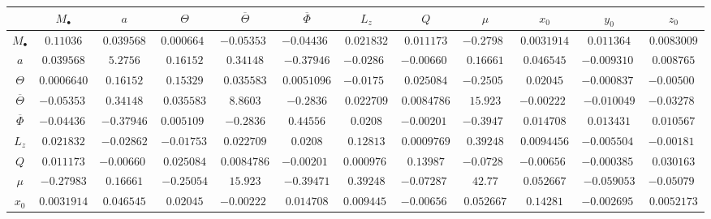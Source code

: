 \begin{sidewaystable}[htbp]
\centering
\begin{tabular}{cccccccccccc}
 & $M_\bullet$ & $a$ & $\Theta$ & $\overline{\Theta}$ & $\overline{\Phi}$ & $L_z$ & $Q$ & $\mu$ & $x_0$ & $y_0$ & $z_0$ \\ \midrule
$M_\bullet$ & $\num{0.11036}$ & $\num{0.039568}$ & $\num{0.00066402}$ & $\num{-0.053532}$ & $\num{-0.044364}$ & $\num{0.021832}$ & $\num{0.011173}$ & $\num{-0.27983}$ & $\num{0.0031914}$ & $\num{0.011364}$ & $\num{0.0083009}$\\
$a$ & $\num{0.039568}$ & $\num{5.2756}$ & $\num{0.16152}$ & $\num{0.34148}$ & $\num{-0.37946}$ & $\num{-0.02862}$ & $\num{-0.0066052}$ & $\num{0.16661}$ & $\num{0.046545}$ & $\num{-0.0093101}$ & $\num{0.008765}$\\
$\Theta$ & $\num{0.00066402}$ & $\num{0.16152}$ & $\num{0.15329}$ & $\num{0.035583}$ & $\num{0.0051096}$ & $\num{-0.017537}$ & $\num{0.025084}$ & $\num{-0.25054}$ & $\num{0.02045}$ & $\num{-0.00083746}$ & $\num{-0.0050044}$\\
$\overline{\Theta}$ & $\num{-0.053532}$ & $\num{0.34148}$ & $\num{0.035583}$ & $\num{8.8603}$ & $\num{-0.2836}$ & $\num{0.022709}$ & $\num{0.0084786}$ & $\num{15.923}$ & $\num{-0.0022206}$ & $\num{-0.010049}$ & $\num{-0.032782}$\\
$\overline{\Phi}$ & $\num{-0.044364}$ & $\num{-0.37946}$ & $\num{0.0051096}$ & $\num{-0.2836}$ & $\num{0.44556}$ & $\num{0.0208}$ & $\num{-0.0020175}$ & $\num{-0.39471}$ & $\num{0.014708}$ & $\num{0.013431}$ & $\num{0.010567}$\\
$L_z$ & $\num{0.021832}$ & $\num{-0.02862}$ & $\num{-0.017537}$ & $\num{0.022709}$ & $\num{0.0208}$ & $\num{0.12813}$ & $\num{0.0009769}$ & $\num{0.39248}$ & $\num{0.0094456}$ & $\num{-0.0055042}$ & $\num{-0.0018176}$\\
$Q$ & $\num{0.011173}$ & $\num{-0.0066052}$ & $\num{0.025084}$ & $\num{0.0084786}$ & $\num{-0.0020175}$ & $\num{0.0009769}$ & $\num{0.13987}$ & $\num{-0.072871}$ & $\num{-0.0065657}$ & $\num{-0.00038537}$ & $\num{0.030163}$\\
$\mu$ & $\num{-0.27983}$ & $\num{0.16661}$ & $\num{-0.25054}$ & $\num{15.923}$ & $\num{-0.39471}$ & $\num{0.39248}$ & $\num{-0.072871}$ & $\num{42.77}$ & $\num{0.052667}$ & $\num{-0.059053}$ & $\num{-0.050792}$\\
$x_0$ & $\num{0.0031914}$ & $\num{0.046545}$ & $\num{0.02045}$ & $\num{-0.0022206}$ & $\num{0.014708}$ & $\num{0.0094456}$ & $\num{-0.0065657}$ & $\num{0.052667}$ & $\num{0.14281}$ & $\num{-0.0026959}$ & $\num{0.0052173}$\\

\end{tabular}
\end{sidewaystable}
